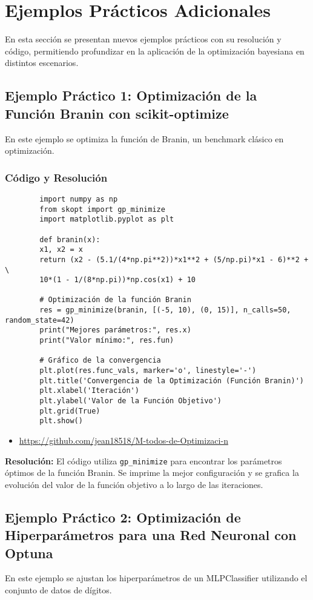 \documentclass[12pt]{article}
\begin{document}
	\section{Ejemplos Prácticos Adicionales}
	En esta sección se presentan nuevos ejemplos prácticos con su resolución y código, permitiendo profundizar en la aplicación de la optimización bayesiana en distintos escenarios.
	
	\subsection{Ejemplo Práctico 1: Optimización de la Función Branin con scikit-optimize}
	En este ejemplo se optimiza la función de Branin, un benchmark clásico en optimización.
	
	\subsubsection*{Código y Resolución}
	\begin{verbatim}
		import numpy as np
		from skopt import gp_minimize
		import matplotlib.pyplot as plt
		
		def branin(x):
		x1, x2 = x
		return (x2 - (5.1/(4*np.pi**2))*x1**2 + (5/np.pi)*x1 - 6)**2 + \
		10*(1 - 1/(8*np.pi))*np.cos(x1) + 10
		
		# Optimización de la función Branin
		res = gp_minimize(branin, [(-5, 10), (0, 15)], n_calls=50, random_state=42)
		print("Mejores parámetros:", res.x)
		print("Valor mínimo:", res.fun)
		
		# Gráfico de la convergencia
		plt.plot(res.func_vals, marker='o', linestyle='-')
		plt.title('Convergencia de la Optimización (Función Branin)')
		plt.xlabel('Iteración')
		plt.ylabel('Valor de la Función Objetivo')
		plt.grid(True)
		plt.show()
	\end{verbatim}
	\begin{itemize}
		\item \url{https://github.com/jean18518/M-todos-de-Optimizaci-n}
	\end{itemize}
	\textbf{Resolución:} El código utiliza \texttt{gp\_minimize} para encontrar los parámetros óptimos de la función Branin. Se imprime la mejor configuración y se grafica la evolución del valor de la función objetivo a lo largo de las iteraciones.
	
	\subsection{Ejemplo Práctico 2: Optimización de Hiperparámetros para una Red Neuronal con Optuna}
	En este ejemplo se ajustan los hiperparámetros de un MLPClassifier utilizando el conjunto de datos de dígitos.
	
\end{document}
